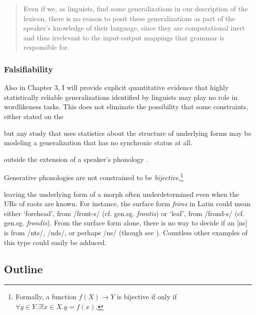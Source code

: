 \begin{quotation}
Even if we, as linguists, find some generalizations in our description of the lexicon, there is no reason to posit these generalizations as part of the speaker's knowledge of their language, since they are computational inert and thus irrelevant to the input-output mappings that grammar is responsible for. \citep[][18-19]{PE}
\end{quotation}

\subsubsection{Falsifiability}          %

Also in Chapter 3, I will provide explicit quantitative evidence that highly statistically reliable generalizations identified by linguists may play no role in wordlikeness tasks. This does not eliminate the possibility that some constraints, either stated on the 

but any study that uses statistics about the structure of underlying forms may be modeling a generalization that has no synchronic status at all.

outside the extension of a speaker's phonology \citep[][3]{Goldsmith1995}.

Generative phonologies are not constrained to be \emph{bijective},\footnote{Formally, a function $f(X) \rightarrow Y$ is bijective if only if $\forall y \in Y . \exists! x \in X . y = f(x)$. 
}

leaving the underlying form of a morph often underdetermined even when the URs of roots are known. For instance, the surface form \emph{frōns} in Latin could mean either `forehead', from /front-s/ (cf. gen.sg. \emph{frontis}) or `leaf', from /frond-s/ (cf. gen.sg. \emph{frondis}). From the surface form alone, there is no way to decide if an [ns] is from /nts/, /nds/, or perhaps /ns/ (though see \citealt{Gorman2011b}). Countless other examples of this type could easily be adduced.


\subsection{Outline}

